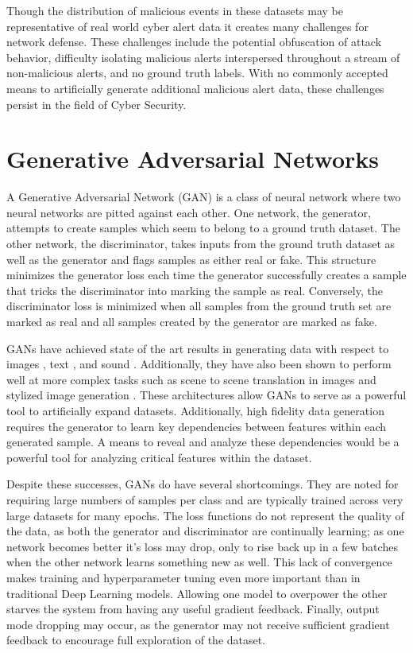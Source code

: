 Though the distribution of malicious events in these datasets may be representative of real world cyber alert data it creates many challenges for network defense. These challenges include the potential obfuscation of attack behavior, difficulty isolating malicious alerts interspersed throughout a stream of non-malicious alerts, and no ground truth labels. With no commonly accepted means to artificially generate additional malicious alert data, these challenges persist in the field of Cyber Security. 

\section{Generative Adversarial Networks}

A Generative Adversarial Network (GAN) is a class of neural network where two neural networks are pitted against each other. One network, the generator, attempts to create samples which seem to belong to a ground truth dataset. The other network, the discriminator, takes inputs from the ground truth dataset as well as the generator and flags samples as either real or fake. This structure minimizes the generator loss each time the generator successfully creates a sample that tricks the discriminator into marking the sample as real. Conversely, the discriminator loss is minimized when all samples from the ground truth set are marked as real and all samples created by the generator are marked as fake.

GANs have achieved state of the art results in generating data with respect to images \cite {Karras2018, Zhu2017, Ledig2016}, text \cite{Su2018}, and sound \cite{Dong2018, Gao2018}.  Additionally, they have also been shown to perform well at more complex tasks such as scene to scene translation in images \cite{Zhu2017, Choi2017} and stylized image generation \cite{Karras2018}. These architectures allow GANs to serve as a powerful tool to artificially expand datasets. Additionally, high fidelity data generation requires the generator to learn key dependencies between features within each generated sample. A means to reveal and analyze these dependencies would be a powerful tool for analyzing critical features within the dataset.

Despite these successes, GANs do have several shortcomings. They are noted for requiring large numbers of samples per class and are typically trained across very large datasets for many epochs. The loss functions do not represent the quality of the data, as both the generator and discriminator are continually learning; as one network becomes better it's loss may drop, only to rise back up in a few batches when the other network learns something new as well. This lack of convergence makes training and hyperparameter tuning even more important than in traditional Deep Learning models. Allowing one model to overpower the other starves the system from having any useful gradient feedback. Finally, output mode dropping may occur, as the generator may not receive sufficient gradient feedback to encourage full exploration of the dataset.

